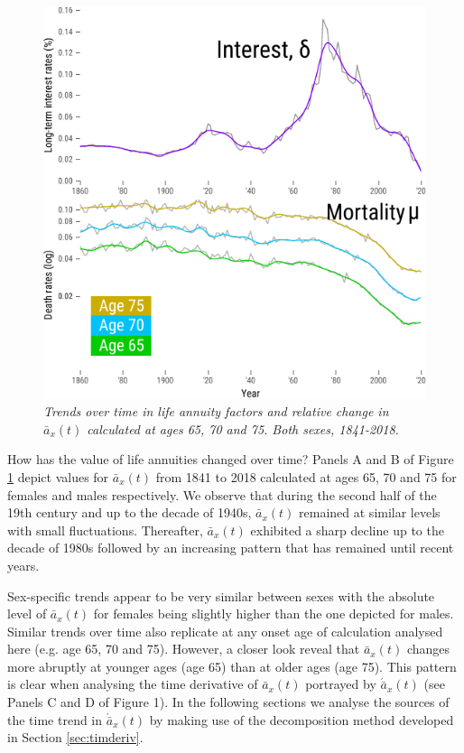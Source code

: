 \documentclass[12pt]{article}
\begin{document}
\begin{figure}[!ht]
	\centering
	\includegraphics[width=1\textwidth]{Fig/Fig1}
	\caption{\textit{Trends over time in life annuity factors and relative change in $\bar{a}_x(t)$ calculated at ages 65, 70 and 75. Both sexes, 1841-2018.}}
	\label{fig:Fig1}
\end{figure}


How has the value of life annuities changed over time? Panels A and B of Figure \ref{fig:Fig1} depict values for $\bar{a}_x(t)$ from 1841 to 2018 calculated at ages 65, 70 and 75 for females and males respectively. We observe that during the second half of the 19th century and up to the decade of 1940s, $\bar{a}_x(t)$ remained at similar levels with small fluctuations. Thereafter, $\bar{a}_x(t)$ exhibited a sharp decline up to the decade of 1980s followed by an increasing pattern that has remained until recent years.
  
Sex-specific trends appear to be very similar between sexes with the absolute level of $\bar{a}_x(t)$ for females being slightly higher than the one depicted for males. Similar trends over time also replicate at any onset age of calculation analysed here (e.g. age 65, 70 and 75). However, a closer look reveal that $\bar{a}_x(t)$ changes more abruptly at younger ages (age 65) than at older ages (age 75). This pattern is clear when analysing the time derivative of $\bar{a}_x(t)$ portrayed by $\acute{\bar{a}}_x(t)$  (see Panels C and D of Figure 1). In the following sections we analyse the sources of the time trend in  $\acute{\bar{a}}_x(t)$ by making use of the decomposition method developed in Section \ref{sec:timderiv}.
\end{document}
